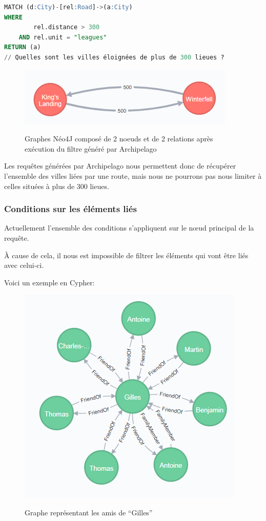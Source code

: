 \documentclass[a4paper,fleqn,12pt]{report}
\begin{document}
\begin{lstlisting}[language=SQL]
MATCH (d:City)-[rel:Road]->(a:City)
WHERE
	    rel.distance > 300
	AND rel.unit = "leagues"
RETURN (a)
// Quelles sont les villes éloignées de plus de 300 lieues ?
\end{lstlisting} 


\begin{figure}[!ht]
\centering
\includegraphics[scale=0.8]{figures/citiesRelFilt.png}
\label{fig:citiesRelFilt}
\caption{Graphes Néo4J composé de 2 noeuds et de 2 relations après exécution du filtre généré par Archipelago}
\end{figure}

Les requêtes générées par Archipelago nous permettent donc de récupérer l'ensemble des villes liées par une route, mais nous ne pourrons pas nous limiter à celles situées à plus de 300 lieues.

\subsubsection*{\bf Conditions sur les éléments liés}

Actuellement l'ensemble des conditions s'appliquent sur le nœud principal de la requête.

\`A cause de cela, il nous est impossible de filtrer les éléments qui vont être liés avec celui-ci. 

Voici un exemple en Cypher:

\begin{figure}[!ht]
\centering
\includegraphics[scale=1]{figures/friendOf.png}
\label{fig:friendOf}
\caption{Graphe représentant les amis de \enquote{Gilles}}
\end{figure}
 
\end{document}
